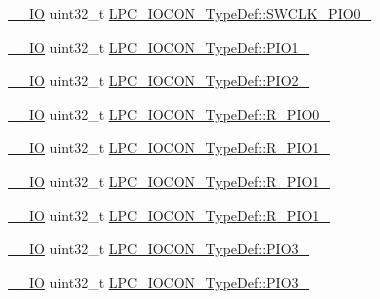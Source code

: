 \begin{DoxyCompactItemize}
\item 
\hyperlink{group___c_m_s_i_s__core__definitions_gaec43007d9998a0a0e01faede4133d6be}{\+\_\+\+\_\+\+IO} uint32\+\_\+t \hyperlink{group___l_p_c11xx___definitions_ga1c20cfee78e9855265f6c58d56d43086}{L\+P\+C\+\_\+\+I\+O\+C\+O\+N\+\_\+\+Type\+Def\+::\+S\+W\+C\+L\+K\+\_\+\+P\+I\+O0\+\_}
\item 
\hyperlink{group___c_m_s_i_s__core__definitions_gaec43007d9998a0a0e01faede4133d6be}{\+\_\+\+\_\+\+IO} uint32\+\_\+t \hyperlink{group___l_p_c11xx___definitions_ga952de1f8b6cdc4f74c39ecc5997372dc}{L\+P\+C\+\_\+\+I\+O\+C\+O\+N\+\_\+\+Type\+Def\+::\+P\+I\+O1\+\_}
\item 
\hyperlink{group___c_m_s_i_s__core__definitions_gaec43007d9998a0a0e01faede4133d6be}{\+\_\+\+\_\+\+IO} uint32\+\_\+t \hyperlink{group___l_p_c11xx___definitions_gad384ab0e4ae297786b37d2c3a874508f}{L\+P\+C\+\_\+\+I\+O\+C\+O\+N\+\_\+\+Type\+Def\+::\+P\+I\+O2\+\_}
\item 
\hyperlink{group___c_m_s_i_s__core__definitions_gaec43007d9998a0a0e01faede4133d6be}{\+\_\+\+\_\+\+IO} uint32\+\_\+t \hyperlink{group___l_p_c11xx___definitions_ga217ef0df39e9b59c6633cdaf10460939}{L\+P\+C\+\_\+\+I\+O\+C\+O\+N\+\_\+\+Type\+Def\+::\+R\+\_\+\+P\+I\+O0\+\_}
\item 
\hyperlink{group___c_m_s_i_s__core__definitions_gaec43007d9998a0a0e01faede4133d6be}{\+\_\+\+\_\+\+IO} uint32\+\_\+t \hyperlink{group___l_p_c11xx___definitions_gafa554ece26b1cedbb06e8def15bec47e}{L\+P\+C\+\_\+\+I\+O\+C\+O\+N\+\_\+\+Type\+Def\+::\+R\+\_\+\+P\+I\+O1\+\_}
\item 
\hyperlink{group___c_m_s_i_s__core__definitions_gaec43007d9998a0a0e01faede4133d6be}{\+\_\+\+\_\+\+IO} uint32\+\_\+t \hyperlink{group___l_p_c11xx___definitions_gad6f021c3546227736e430948dc05e2c3}{L\+P\+C\+\_\+\+I\+O\+C\+O\+N\+\_\+\+Type\+Def\+::\+R\+\_\+\+P\+I\+O1\+\_}
\item 
\hyperlink{group___c_m_s_i_s__core__definitions_gaec43007d9998a0a0e01faede4133d6be}{\+\_\+\+\_\+\+IO} uint32\+\_\+t \hyperlink{group___l_p_c11xx___definitions_gaaade79f615353aeb33fda16202c368fc}{L\+P\+C\+\_\+\+I\+O\+C\+O\+N\+\_\+\+Type\+Def\+::\+R\+\_\+\+P\+I\+O1\+\_}
\item 
\hyperlink{group___c_m_s_i_s__core__definitions_gaec43007d9998a0a0e01faede4133d6be}{\+\_\+\+\_\+\+IO} uint32\+\_\+t \hyperlink{group___l_p_c11xx___definitions_ga2d5f8bc14da9cb94cb5d8184443ba458}{L\+P\+C\+\_\+\+I\+O\+C\+O\+N\+\_\+\+Type\+Def\+::\+P\+I\+O3\+\_}
\item 
\hyperlink{group___c_m_s_i_s__core__definitions_gaec43007d9998a0a0e01faede4133d6be}{\+\_\+\+\_\+\+IO} uint32\+\_\+t \hyperlink{group___l_p_c11xx___definitions_gad8af57ebdb3aa3d29df43ad8d316df81}{L\+P\+C\+\_\+\+I\+O\+C\+O\+N\+\_\+\+Type\+Def\+::\+P\+I\+O3\+\_}

\end{DoxyCompactItemize}
